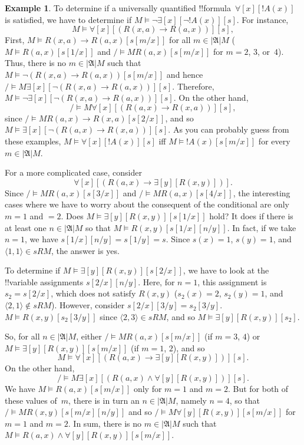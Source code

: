 \documentclass[10pt,a4paper]{article}
\makeatletter
\theoremstyle{plain}
\theoremstyle{definition}
\newtheorem{ex}[thm]{Example}
\theoremstyle{remark}
\providecommand{\lif}{\mathbin{\rightarrow}}
\providecommand{\lforall}{\mathord{\forall}}
\providecommand{\lexists}{\mathord{\exists}}
\providecommand{\Subst}[3]{#1[#2/#3]}
\providecommand{\Domain}{\ensuremath{|\mathfrak{A}|}}
\providecommand{\Assign}{\ensuremath{s}}
\providecommand{\Sat}[2]{\ensuremath{#1 \models #2}}
\providecommand{\tuple}[1]{\langle #1 \rangle}
\providecommand{\iftag}[1]{#1}
\providecommand{\iftag}{}
\def\iftag#1#2#3{\iftag@stop{#2}\iftag@more}
\def\iftag@more{\@ifnextchar\bgroup{\iftag@eat}{\relax}}
\def\iftag@eat#1{}
\def\iftag@stop#1{#1}
\makeatother
\begin{document}
\begin{ex}
\iftag{defAll}{To determine if a universally quantified
  !!{formula}~$\lforall[x][!A(x)]$ is satisfied, we have to determine
  if $\Sat{M}{\lnot\lexists[x][\lnot !A(x)]}[s]$. For instance,
  \[
  \Sat{M}{\lforall[x][(R(x,a) \lif R(a,x))]}[s],
  \]
  First, $\Sat{M}{R(x,a) \lif R(a,x)}[\Subst{s}{m}{x}]$ for all $m \in
  \Domain M$ ($\Sat{M}{R(a,x)}[\Subst{s}{1}{x}]$ and
  $\Sat/{M}{R(a,x)}[\Subst{s}{m}{x}]$ for $m = 2$, $3$, or~$4$).
  Thus, there is no $m \in \Domain M$ such that
  $\Sat{M}{\lnot(R(x,a) \lif R(a,x))}[\Subst{s}{m}{x}]$ and hence
  $\Sat/{M}{\lexists[x][\lnot(R(x,a) \lif R(a,x))]}[s]$. Therefore,
  $\Sat{M}{\lnot\lexists[x][\lnot(R(x,a) \lif R(a,x))]}[s]$. On the
  other hand,
  \[
  \Sat/{M}{\lforall[x][(R(a,x) \lif R(x,a))]}[s],
  \]
  since $\Sat/{M}{R(a,x) \lif R(x,a)}[\Subst{s}{2}{x}]$, and so
  $\Sat{M}{\lexists[x][\lnot(R(a,x) \lif R(x,a))]}[s]$. As you can
  probably guess from these examples, $\Sat{M}{\lforall[x][!A(x)]}[s]$
  iff $\Sat{M}{!A(x)}[\Subst{s}{m}{x}]$ for every $m \in \Domain
  M$.}{}

For a more complicated case, consider
\[
\lforall[x][(R(a,x) \lif \lexists[y][R(x,y)])].
\]
Since $\Sat/{M}{R(a,x)}[\Subst{s}{3}{x}]$ and
$\Sat/{M}{R(a,x)}[\Subst{s}{4}{x}]$, the interesting cases where we
have to worry about the consequent of the conditional are only $m = 1$
and $ = 2$. Does $\Sat{M}{\lexists[y][R(x,y)]}[\Subst{s}{1}{x}]$
hold? It does if there is at least one $n \in \Domain M$ so that
$\Sat{M}{R(x,y)}[\Subst{\Subst{s}{1}{x}}{n}{y}]$. In fact, if we take
$n = 1$, we have $\Subst{\Subst{s}{1}{x}}{n}{y} = \Subst{s}{1}{y} =
s$. Since $s(x) = 1$, $s(y) = 1$, and $\tuple{1,1} \in \Assign{R}{M}$,
the answer is yes. 

To determine if $\Sat{M}{\lexists[y][R(x,y)]}[\Subst{s}{2}{x}]$, we
have to look at the !!{variable} assignments
$\Subst{\Subst{s}{2}{x}}{n}{y}$. Here, for $n = 1$, this assignment
is~$s_2 = \Subst{s}{2}{x}$, which does not satisfy $R(x,y)$ ($s_2(x) =
2$, $s_2(y) = 1$, and $\tuple{2,1}\notin \Assign{R}{M}$). However,
consider $\Subst{\Subst{s}{2}{x}}{3}{y} = \Subst{s_2}{3}{y}$.
$\Sat{M}{R(x,y)}[\Subst{s_2}{3}{y}]$ since $\tuple{2,3} \in
\Assign{R}{M}$, and so $\Sat{M}{\lexists[y][R(x,y)]}[s_2]$.

So, for all $n \in \Domain M$, either
$\Sat/{M}{R(a,x)}[\Subst{s}{m}{x}]$ (if $m = 3$, $4$) or
$\Sat{M}{\lexists[y][R(x,y)]}[\Subst{s}{m}{x}]$ (if $m = 1$, $2$), and so
\[
\Sat{M}{\lforall[x][(R(a,x) \lif \lexists[y][R(x,y)])]}[s].
\]
On the other hand,
\[
\Sat/{M}{\lexists[x][(R(a,x) \land \lforall[y][R(x,y)])]}[s].
\]
We have $\Sat{M}{R(a,x)}[\Subst{s}{m}{x}]$ only for $m = 1$ and $m =
2$. But for both of these values of~$m$, there is in turn an $n \in
\Domain M$, namely $n = 4$, so that
$\Sat/{M}{R(x,y)}[\Subst{\Subst{s}{m}{x}}{n}{y}]$ and so
$\Sat/{M}{\lforall[y][R(x,y)]}[\Subst{s}{m}{x}]$ for $m = 1$ and $m =
2$. In sum, there is no $m \in \Domain M$ such that $\Sat{M}{R(a,x)
\land \lforall[y][R(x,y)]}[\Subst{s}{m}{x}]$.
\end{ex}
\end{document}
